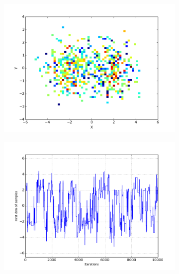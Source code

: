 \begin{figure}%
 \begin{center} 
 
  \begin{subfigure}{.5\textwidth}
    \centering
    \includegraphics[width=\textwidth]{figure_CC_RWM_large_Histo}
  \end{subfigure}%
  \begin{subfigure}{.5\textwidth}
    \centering
    \includegraphics[width=\textwidth]{figure_CC_RWM_large_2}
  \end{subfigure}
  \vspace*{1mm}
  \label{fig:HeuristicHistoPlotRWM-large}
  \vspace*{3mm}
  

\end{center}
\end{figure}
